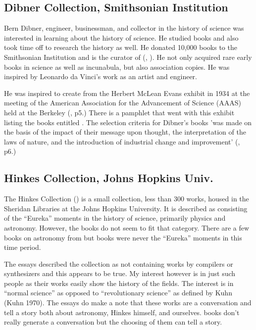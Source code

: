 \documentclass[letterpaper]{article}
\begin{document}
\subsection{Dibner Collection, Smithsonian Institution}

Bern Dibner, engineer, businessman, and collector in the history of
science was interested in learning about the history of science. He
studied books and also took time off to research the history as
well. He donated 10,000 books to the Smithsonian Institution and is
the curator of 
(\cite{Dibner1955}, \cite{Dibner1980}). He not only acquired rare early
books in science as well as incunabula, but also association copies.
He was inspired by Leonardo da Vinci's work as an artist and engineer.

He was inspired to create  from the Herbert
McLean Evans exhibit in 1934 at the  meeting of the American
Association for the Advancement of Science (AAAS) held at the Berkeley
(\cite{Dibner1980}, p5.)  There is a pamphlet that went with this
exhibit listing the books entitled . The selection
criteria for Dibner's books 'was made on the basis of the impact of
their message upon thought, the interpretation of the laws of nature,
and the introduction of industrial change and improvement'
(\cite{Dibner1980}, p6.)

\subsection{Hinkes Collection, Johns Hopkins Univ.}

The Hinkes Collection (\cite{Havens2011}) is a small collection, less
than 300 works, housed in the Sheridan Libraries at the Johns Hopkins
University. It is described as consisting of the ``Eureka'' moments in
the history of science, primarily physics and astronomy. However,
the  books do not seem to fit that category. There are a few
books on astronomy from  but books were never the ``Eureka''
moments in this time period.

The essays described the collection as not containing works by
compilers or synthesizers and this appears to be true.  My interest
however is in just such people as their works easily show the history
of the fields.  The interest is in ``normal science'' as opposed to
``revolutionary science'' as defined by Kuhn (Kuhn 1970). The essays
do make a note that these works are a conversation and tell a story
both about astronomy, Hinkes himself, and ourselves.   books
don't really generate a conversation but the choosing of them can
tell a story.
\end{document}
